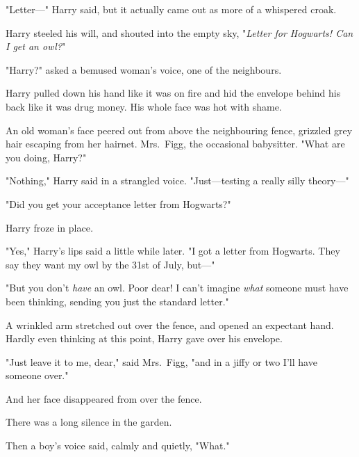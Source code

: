 "Letter---" Harry said, but it actually came out as more of a whispered croak.

Harry steeled his will, and shouted into the empty sky, "\emph{Letter for 
Hogwarts! Can I get an owl?}"

"Harry?" asked a bemused woman's voice, one of the neighbours.

Harry pulled down his hand like it was on fire and hid the envelope behind his 
back like it was drug money. His whole face was hot with shame.

An old woman's face peered out from above the neighbouring fence, grizzled grey 
hair escaping from her hairnet. Mrs.~Figg, the occasional babysitter. "What are 
you doing, Harry?"

"Nothing," Harry said in a strangled voice. "Just---testing a really silly 
theory---"

"Did you get your acceptance letter from Hogwarts?"

Harry froze in place\emph{.}

"Yes," Harry's lips said a little while later. "I got a letter from Hogwarts. 
They say they want my owl by the 31st of July, but---"

"But you don't \emph{have} an owl. Poor dear! I can't imagine \emph{what} 
someone must have been thinking, sending you just the standard letter."

A wrinkled arm stretched out over the fence, and opened an expectant hand. 
Hardly even thinking at this point, Harry gave over his envelope.

"Just leave it to me, dear," said Mrs.~Figg, "and in a jiffy or two I'll have 
someone over."

And her face disappeared from over the fence.

There was a long silence in the garden.

Then a boy's voice said, calmly and quietly, "What."
